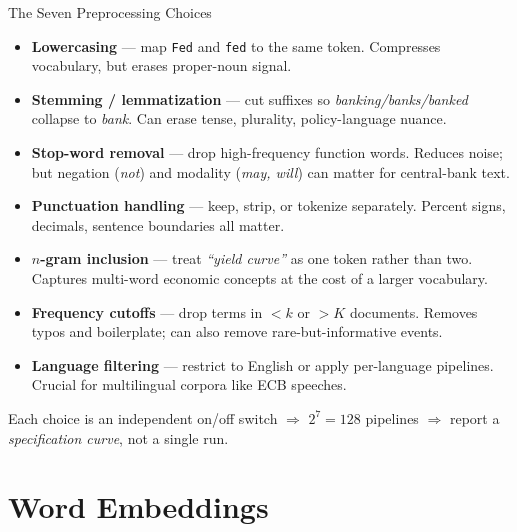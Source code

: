 \documentclass[10pt,english,aspectratio=169]{beamer}
\begin{document}
\begin{frame}{The Seven Preprocessing Choices}
\small
\begin{itemize}
\item \textbf{Lowercasing} --- map \texttt{Fed} and \texttt{fed} to the same token. Compresses vocabulary, but erases proper-noun signal.
\item \textbf{Stemming / lemmatization} --- cut suffixes so \emph{banking/banks/banked} collapse to \emph{bank}. Can erase tense, plurality, policy-language nuance.
\item \textbf{Stop-word removal} --- drop high-frequency function words. Reduces noise; but negation (\emph{not}) and modality (\emph{may, will}) can matter for central-bank text.
\item \textbf{Punctuation handling} --- keep, strip, or tokenize separately. Percent signs, decimals, sentence boundaries all matter.
\item \textbf{$n$-gram inclusion} --- treat \emph{``yield curve''} as one token rather than two. Captures multi-word economic concepts at the cost of a larger vocabulary.
\item \textbf{Frequency cutoffs} --- drop terms in $<k$ or $>K$ documents. Removes typos and boilerplate; can also remove rare-but-informative events.
\item \textbf{Language filtering} --- restrict to English or apply per-language pipelines. Crucial for multilingual corpora like ECB speeches.
\end{itemize}

\smallskip
Each choice is an independent on/off switch $\Rightarrow$ $2^{7} = 128$ pipelines $\Rightarrow$ report a \emph{specification curve}, not a single run.
\end{frame}

\section{Word Embeddings}
\end{document}
